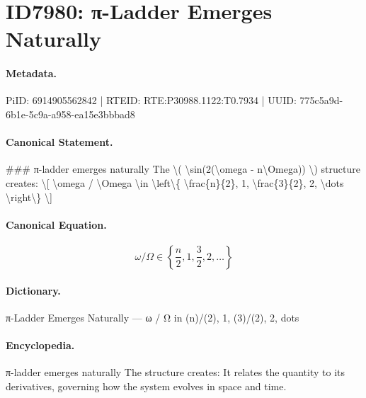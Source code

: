 \section*{ID7980: π-Ladder Emerges Naturally}
\paragraph{Metadata.}
PiID: 6914905562842 | RTEID: RTE:P30988.1122:T0.7934 | UUID: 775c5a9d-6b1e-5c9a-a958-ea15e3bbbad8

\paragraph{Canonical Statement.}
\#\#\# π-ladder emerges naturally The \textbackslash{}( \textbackslash{}sin(2(\textbackslash{}omega - n\textbackslash{}Omega)) \textbackslash{}) structure creates: \textbackslash{}[ \textbackslash{}omega / \textbackslash{}Omega \textbackslash{}in \textbackslash{}left\textbackslash{}\{ \textbackslash{}frac\{n\}\{2\}, 1, \textbackslash{}frac\{3\}\{2\}, 2, \textbackslash{}dots \textbackslash{}right\textbackslash{}\} \textbackslash{}]

\paragraph{Canonical Equation.}
\[
\omega / \Omega \in \left\{ \frac{n}{2}, 1, \frac{3}{2}, 2, \dots \right\}
\]

\paragraph{Dictionary.}
π-Ladder Emerges Naturally — ω / Ω in (n)/(2), 1, (3)/(2), 2, dots

\paragraph{Encyclopedia.}
π-ladder emerges naturally The structure creates: It relates the quantity to its derivatives, governing how the system evolves in space and time.
